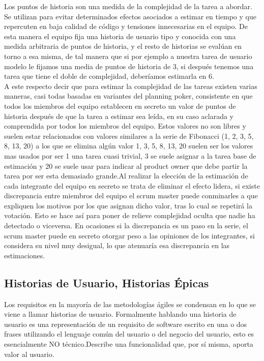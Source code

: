 \documentclass[../pfc.tex]{subfiles}
\begin{document}
	Los puntos de historia son una medida de la complejidad de la tarea a abordar. Se utilizan para evitar determinados efectos asociados a estimar en tiempo y que repercuten en baja calidad de código y tensiones innecesarias en el equipo. De esta manera el equipo fija una historia de usuario tipo y conocida con una medida arbitraria de puntos de historia, y el resto de historias se evalúan en torno a esa misma, de tal manera que si por ejemplo a nuestra tarea de usuario modelo le fijamos una media de puntos de historia de 3, si después tenemos una tarea que tiene el doble de complejidad, deberíamos estimarla en 6.\\
	
	A este respecto decir que para estimar la complejidad de las tareas existen varias maneras, casi todas basadas en variantes  del planning poker, consistente en que todos los miembros del equipo establecen en secreto un valor de puntos de historia después de que la tarea a estimar sea leída, en su caso aclarada y comprendida por todos los miembros del equipo. Estos valores no son libres y suelen estar relacionados con valores similares a la serie de Fibonacci (1, 2, 3, 5, 8, 13, 20) a los que se elimina algún valor 1, 3, 5, 8, 13, 20 suelen ser los valores mas usados por ser 1 una tarea cuasi trivial, 3 se suele asignar a la tarea base de estimación y 20 se suele usar para indicar al product owner que debe partir la tarea por ser esta demasiado grande.Al realizar la elección de la estimación de cada integrante del equipo en secreto se trata de eliminar el efecto lidera, si existe discrepancia entre miembros del equipo el scrum master puede conminarles a que expliquen los motivos por los que asignan dicho valor, tras lo cual se repetirá la votación. Esto se hace así para poner de relieve complejidad oculta que nadie ha detectado o viceversa. En ocasiones si la discrepancia es un paso en la serie, el scrum master puede en secreto otorgar peso a las opiniones de los integrantes, si considera su nivel muy desigual, lo que atenuaría esa discrepancia en las estimaciones.
	
	\subsection{Historias de Usuario, Historias Épicas}
	
	Los requisitos en la mayoría de las metodologías ágiles se condensan en lo que se viene a llamar historias de usuario. Formalmente hablando una historia de usuario es una representación de un requisito de software escrito en una o dos frases utilizando el lenguaje común del usuario o del negocio del usuario, esto es esencialmente NO técnico.Describe una funcionalidad que, por sí misma, aporta valor al usuario.\\
	
\end{document}
